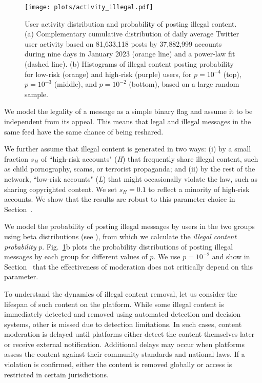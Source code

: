 \documentclass{article}
\begin{document}
\begin{figure}
\centering
\texttt{[image: plots/activity\_illegal.pdf]}
\caption{User activity distribution and probability of posting illegal content. (a) Complementary cumulative distribution of daily average Twitter user activity based on 81{,}633{,}118 posts by 37{,}882{,}999 accounts during nine days in January 2023 (orange line) and a power-law fit (dashed line). (b) Histograms of illegal content posting probability for low-risk (orange) and high-risk (purple) users, for $p=10^{-4}$ (top), $p=10^{-3}$ (middle), and $p=10^{-2}$ (bottom), based on a large random sample.}
\label{fig:activity_illegal}
\end{figure}

We model the legality of a message as a simple binary flag and assume it to be independent from its appeal. This means that legal and illegal messages in the same feed have the same chance of being reshared. 

We further assume that illegal content is generated in two ways: (i) by a small fraction $s_{H}$ of ``high-risk accounts" (\textit{H}) that frequently share illegal content, such as child pornography, scams, or terrorist propaganda; and (ii) by the rest of the network, ``low-risk accounts" (\textit{L}) that might occasionally violate the law, such as sharing copyrighted content. We set $s_{H}=0.1$ to reflect a minority of high-risk accounts. 
We show that the results are robust to this parameter choice in Section~. 

We model the probability of posting illegal messages by users in the two groups using beta distributions (see ), from which we calculate the \emph{illegal content probability} $p$.  Fig.~\ref{fig:activity_illegal}b plots the probability distributions of posting illegal messages by each group for different values of $p$. 
We use $p=10^{-2}$ and show in Section~ that the effectiveness of moderation does not critically depend on this parameter.

To understand the dynamics of illegal content removal, let us consider the lifespan of such content on the platform. While some illegal content is immediately detected and removed using automated detection and decision systems, other is missed due to detection limitations. In such cases, content moderation is delayed until platforms either detect the content themselves later or receive external notification. Additional delays may occur when platforms assess the content against their community standards and national laws. If a violation is confirmed, either the content is removed globally or access is restricted in certain jurisdictions. 
\end{document}
